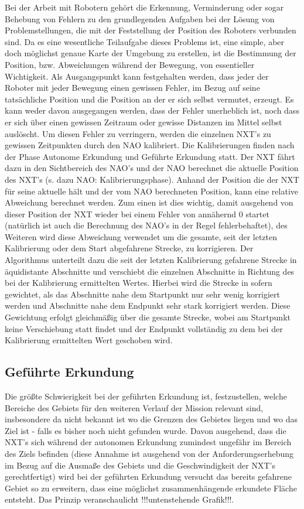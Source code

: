 Bei der Arbeit mit Robotern gehört die Erkennung, Verminderung oder sogar Behebung von Fehlern zu den grundlegenden Aufgaben bei der Lösung von Problemstellungen, die mit der Feststellung der Position des Roboters verbunden sind. Da es eine wesentliche Teilaufgabe dieses Problems ist, eine simple, aber doch möglichst genaue Karte der Umgebung zu erstellen, ist die Bestimmung der Position, bzw. Abweichungen während der Bewegung, von essentieller Wichtigkeit.
Als Ausgangspunkt kann festgehalten werden, dass jeder der Roboter mit jeder Bewegung einen gewissen Fehler, im Bezug auf seine tatsächliche Position und die Position an der er sich selbst vermutet, erzeugt. Es kann weder davon ausgegangen werden, dass der Fehler unerheblich ist, noch dass er sich über einen gewissen Zeitraum oder gewisse Distanzen im Mittel selbst auslöscht. Um diesen Fehler zu verringern, werden die einzelnen NXT's zu gewissen Zeitpunkten durch den NAO kalibriert. Die Kalibrierungen finden nach der Phase Autonome Erkundung und Geführte Erkundung statt. Der NXT fährt dazu in den Sichtbereich des NAO's und der NAO berechnet die aktuelle Position des NXT's (s. dazu NAO: Kalibrierungsphase). Anhand der Position die der NXT für seine aktuelle hält und der vom NAO berechneten Position, kann eine relative Abweichung berechnet werden. Zum einen ist dies wichtig, damit ausgehend von dieser Position der NXT wieder bei einem Fehler von annähernd 0 startet (natürlich ist auch die Berechnung des NAO's in der Regel fehlerbehaftet), des Weiteren wird diese Abweichung verwendet um die gesamte, seit der letzten Kalibrierung oder dem Start abgefahrene Strecke, zu korrigieren. Der Algorithmus unterteilt dazu die seit der letzten Kalibrierung gefahrene Strecke in äquidistante Abschnitte und verschiebt die einzelnen Abschnitte in Richtung des bei der Kalibrierung ermittelten Wertes. Hierbei wird die Strecke in sofern gewichtet, als das Abschnitte nahe dem Startpunkt nur sehr wenig korrigiert werden und Abschnitte nahe dem Endpunkt sehr stark korrigiert werden. Diese Gewichtung erfolgt gleichmäßig über die gesamte Strecke, wobei am Startpunkt keine Verschiebung statt findet und der Endpunkt vollständig zu dem bei der Kalibrierung ermittelten Wert geschoben wird.

\subsection{Geführte Erkundung}

Die größte Schwierigkeit bei der geführten Erkundung ist, festzustellen, welche Bereiche des Gebiets für den weiteren Verlauf der Mission relevant sind, insbesondere da nicht bekannt ist wo die Grenzen des Gebietes liegen und wo das Ziel ist - falls es bisher noch nicht gefunden wurde. Davon ausgehend, dass die NXT's sich während der autonomen Erkundung zumindest ungefähr im Bereich des Ziels befinden (diese Annahme ist ausgehend von der Anforderungserhebung im Bezug auf die Ausmaße des Gebiets und die Geschwindigkeit der NXT's gerechtfertigt) wird bei der geführten Erkundung versucht das bereits gefahrene Gebiet so zu erweitern, dass eine möglichst zusammenhängende erkundete Fläche entsteht. Das Prinzip veranschaulicht !!!untenstehende Grafik!!!.


